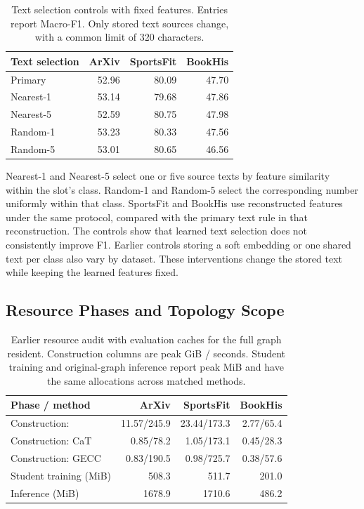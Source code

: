 \begin{table}[H]
\centering
\footnotesize
\caption{Text selection controls with fixed features. Entries report Macro-F1. Only stored text sources change, with a common limit of 320 characters.}
\label{tab:text_budget}
\begin{tabular*}{\linewidth}{@{\extracolsep{\fill}}lrrr@{}}
\toprule
Text selection & ArXiv & SportsFit & BookHis\\
\midrule
Primary & 52.96 & 80.09 & 47.70\\
Nearest-1 & 53.14 & 79.68 & 47.86\\
Nearest-5 & 52.59 & 80.75 & 47.98\\
Random-1 & 53.23 & 80.33 & 47.56\\
Random-5 & 53.01 & 80.65 & 46.56\\
\bottomrule
\end{tabular*}
\end{table}

Nearest-1 and Nearest-5 select one or five source texts by feature similarity
within the slot's class. Random-1 and Random-5 select the corresponding
number uniformly within that class. SportsFit and BookHis use reconstructed
features under the same protocol, compared with the primary text rule in
that reconstruction. The controls show that learned text selection does not
consistently improve F1. Earlier controls storing a soft embedding or one
shared text per class also vary by dataset. These interventions change the
stored text while keeping the learned features fixed.

\subsection{Resource Phases and Topology Scope}

\begin{table}[H]
\centering
\footnotesize
\setlength{\tabcolsep}{3pt}
\caption{Earlier resource audit with evaluation caches for the full graph resident.
Construction columns are peak GiB / seconds.
Student training and original-graph inference report peak MiB and have the
same allocations across matched methods.}
\label{tab:phase_resources}
\begin{tabular*}{\linewidth}{@{\extracolsep{\fill}}lrrr@{}}
\toprule
Phase / method & ArXiv & SportsFit & BookHis\\
\midrule
Construction: \method{} & 11.57/245.9 & 23.44/173.3 & 2.77/65.4\\
Construction: CaT & 0.85/78.2 & 1.05/173.1 & 0.45/28.3\\
Construction: GECC & 0.83/190.5 & 0.98/725.7 & 0.38/57.6\\
Student training (MiB) & 508.3 & 511.7 & 201.0\\
Inference (MiB) & 1678.9 & 1710.6 & 486.2\\
\bottomrule
\end{tabular*}
\end{table}

